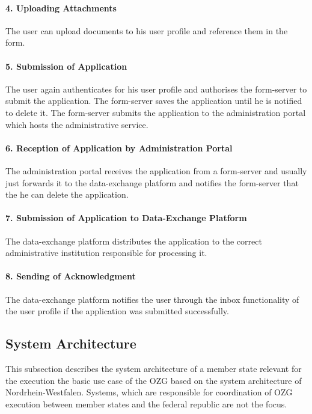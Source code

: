 \documentclass[
     12pt,         %
     a4paper,      %
     BCOR=10mm,version=first,     %
     DIV=14,version=first,        %
     ]{scrreprt}
\begin{document}
\paragraph{4. Uploading Attachments}
The user can upload documents to his user profile and reference them in the form.

\paragraph{5. Submission of Application}
The user again authenticates for his user profile and authorises the form-server to submit the application. The form-server saves the application until he is notified to delete it. The form-server submits the application to the administration portal which hosts the administrative service.

\paragraph{6. Reception of Application by Administration Portal}
The administration portal receives the application from a form-server and usually just forwards it to the data-exchange platform and notifies the form-server that the he can delete the application.

\paragraph{7. Submission of Application to Data-Exchange Platform}
The data-exchange platform distributes the application to the correct administrative institution responsible for processing it.

\paragraph{8. Sending of Acknowledgment}
The data-exchange platform notifies the user through the inbox functionality of the user profile if the application was submitted successfully.

\subsection{System Architecture}
This subsection describes the system architecture of a member state relevant for the execution the basic use case of the OZG based on the system architecture of Nordrhein-Westfalen. Systems, which are responsible for coordination of OZG execution between member states and the federal republic are not the focus.
\end{document}
